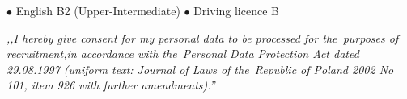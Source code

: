\documentclass[11pt,a4paper]{article}
\begin{document}
  
    \vspace{0.5cm}
  
    \medskip
    \centerline{
        \hfill
        $\bullet$ English B2 (Upper-Intermediate)
        \hfill
        $\bullet$ Driving licence B
        \hfill
    }
  
  
    \vspace{0.92cm}
    \noindent \textit{,,I hereby give consent for my personal data to be processed for the~purposes
    of recruitment,\linebreak in accordance with the~Personal Data Protection Act dated 29.08.1997
    (uniform text: Journal of Laws of the~Republic of Poland 2002 No 101, item 926
    with further amendments).''}
\end{document}

